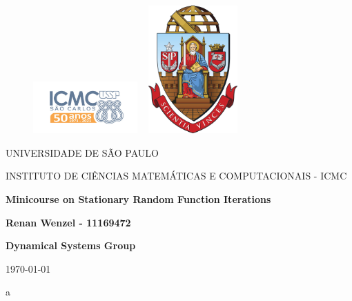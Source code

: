 \documentclass[12pt]{article}
\theoremstyle{definition}
\begin{document}
\begin{figure}[ht]
	\includegraphics[width=4cm]{../../icmc.png}
	\hspace{7cm}
	\includegraphics[height=4.9cm,width=4cm]{../../brasao_usp_cor.jpg}
	\endminipage
\end{figure}

\begin{center}
	\vspace{1cm}
	\LARGE
	UNIVERSIDADE DE SÃO PAULO

	\vspace{1.3cm}
	\LARGE
	INSTITUTO DE CIÊNCIAS MATEMÁTICAS E COMPUTACIONAIS - ICMC

	\vspace{1.7cm}
	\Large
	\textbf{Minicourse on Stationary Random Function Iterations}

	\vspace{1.3cm}
	\large
	\textbf{Renan Wenzel - 11169472}

	\vspace{1.3cm}
	\large

	\textbf{Dynamical Systems Group}

	\vspace{1.3cm}
	\today
\end{center}

\newpage
\tableofcontents
\newpage


\newpage

\newpage

\begin{thebibliography}{99}
	a
\end{thebibliography}
\end{document}
